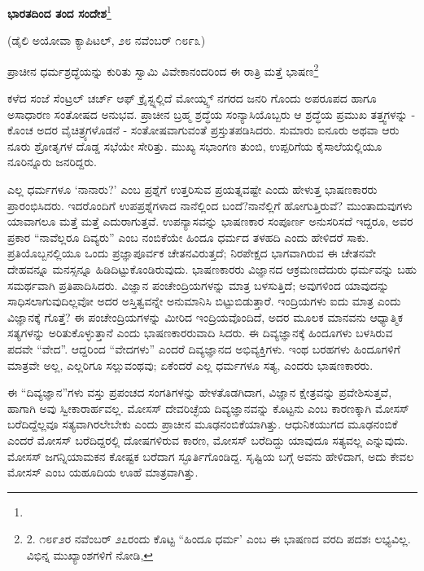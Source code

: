 \begin{center}
\textbf{ಭಾರತದಿಂದ ತಂದ ಸಂದೇಶ}\footnote{}
\end{center}

\begin{center}
(ಡೈಲಿ ಅಯೋವಾ ಕ್ಯಾಪಿಟಲ್, ೨೮ ನವೆಂಬರ್ ೧೮೯೩)
\end{center}

ಪ್ರಾಚೀನ ಧರ್ಮಶ್ರದ್ಧೆಯನ್ನು ಕುರಿತು ಸ್ವಾಮಿ ವಿವೇಕಾನಂದರಿಂದ ಈ ರಾತ್ರಿ ಮತ್ತೆ ಭಾಷಣ\footnote{2. ೧೮೯೨ರ ನವೆಂಬರ್ ೨೭ರಂದು ಕೊಟ್ಟ “ಹಿಂದೂ ಧರ್ಮ’ ಎಂಬ ಈ ಭಾಷಣದ ವರದಿ ಪದಶಃ ಲಭ್ಯವಿಲ್ಲ. ವಿಭಿನ್ನ ಮುಖ್ಯಾಂಶಗಳಿಗೆ ನೋಡಿ, }

ಕಳೆದ ಸಂಜೆ ಸೆಂಟ್ರಲ್ ಚರ್ಚ್ ಆಫ್ ಕ್ರೈಸ್ಟ್ನಲ್ಲಿದೆ ಮೋಯ್ನ್ಸ್ ನಗರದ ಜನರಿ ಗೊಂದು ಅಪರೂಪದ ಹಾಗೂ ಅಸಾಧಾರಣ ಸಂತೋಷದ ಅನುಭವ. ಪ್ರಾಚೀನ ಬ್ರಹ್ಮ ಶ್ರದ್ಧೆಯ ಸಂನ್ಯಾಸಿಯೊಬ್ಬರು ಆ ಶ್ರದ್ಧೆಯ ಪ್ರಮುಖ ತತ್ತ್ವಗಳನ್ನು - ಕೊಂಚ ಅದರ ವೈಚಿತ್ರ್ಯಗಳೊಡನೆ - ಸಂತೋಷವಾಗುವಂತೆ ಪ್ರಸ್ತುತಪಡಿಸಿದರು. ಸುಮಾರು ಐನೂರು ಅಥವಾ ಆರು ನೂರು ಶ್ರೋತೃಗಳ ದೊಡ್ಡ ಸಭೆಯೇ ಸೇರಿತ್ತು. ಮುಖ್ಯ ಸಭಾಂಗಣ ತುಂಬಿ, ಉಪ್ಪರಿಗೆಯ ಕೈಸಾಲೆಯಲ್ಲಿಯೂ ನೂರಿನ್ನೂರು ಜನರಿದ್ದರು.

ಎಲ್ಲ ಧರ್ಮಗಳೂ ‘ನಾನಾರು?’ ಎಂಬ ಪ್ರಶ್ನೆಗೆ ಉತ್ತರಿಸುವ ಪ್ರಯತ್ನವಷ್ಟೇ ಎಂದು ಹೇಳುತ್ತ ಭಾಷಣಕಾರರು ಪ್ರಾರಂಭಿಸಿದರು. ಇದರೊಂದಿಗೆ ಉಪಪ್ರಶ್ನೆಗಳಾದ ನಾನೆಲ್ಲಿಂದ ಬಂದೆ?ನಾನೆಲ್ಲಿಗೆ ಹೋಗುತ್ತಿರುವೆ? ಮುಂತಾದುವುಗಳು ಯಾವಾಗಲೂ ಮತ್ತೆ ಮತ್ತೆ ಎದುರಾಗುತ್ತವೆ. ಉಪನ್ಯಾಸವನ್ನು ಭಾಷಣಕಾರ ಸಂಪೂರ್ಣ ಅನುಸರಿಸದೆ ಇದ್ದರೂ, ಅವರ ಪ್ರಕಾರ “ನಾವೆಲ್ಲರೂ ದಿವ್ಯರು” ಎಂಬ ನಂಬಿಕೆಯೇ ಹಿಂದೂ ಧರ್ಮದ ತಳಹದಿ ಎಂದು ಹೇಳಿದರೆ ಸಾಕು. ಪ್ರತಿಯೊಬ್ಬನಲ್ಲಿಯೂ ಒಂದು ಪ್ರಜ್ಞಾಪೂರ್ವಕ ಚೇತನವಿರುತ್ತದೆ; ನಿರಪೇಕ್ಷದ ಭಾಗವಾಗಿರುವ ಈ ಚೇತನವೇ ದೇಹವನ್ನೂ ಮನಸ್ಸನ್ನೂ ಹಿಡಿದಿಟ್ಟುಕೊಂಡಿರುವುದು. ಭಾಷಣಕಾರರು ವಿಜ್ಞಾನದ ಆಕ್ರಮಣದೆದುರು ಧರ್ಮವನ್ನು ಬಹು ಸಮರ್ಥವಾಗಿ ಪ್ರತಿಪಾದಿಸಿದರು. ವಿಜ್ಞಾನ ಪಂಚೇಂದ್ರಿಯಗಳನ್ನು ಮಾತ್ರ ಬಳಸುತ್ತಿದೆ; ಅವುಗಳಿಂದ ಯಾವುದನ್ನು ಸಾಧಿಸಲಾಗುವುದಿಲ್ಲವೋ ಅದರ ಅಸ್ತಿತ್ವವನ್ನೇ ಅನುಮಾನಿಸಿ ಬಿಟ್ಟುಬಿಡುತ್ತಾರೆ. ಇಂದ್ರಿಯಗಳು ಐದು ಮಾತ್ರ ಎಂದು ವಿಜ್ಞಾನಕ್ಕೆ ಗೊತ್ತೆ? ಈ ಪಂಚೇಂದ್ರಿಯಗಳನ್ನು ಮೀರಿದ ಇಂದ್ರಿಯವೊಂದಿದೆ, ಅದರ ಮೂಲಕ ಮಾನವನು ಆಧ್ಯಾತ್ಮಿಕ ಸತ್ಯಗಳನ್ನು ಅರಿತುಕೊಳ್ಳುತ್ತಾನೆ ಎಂದು ಭಾಷಣಕಾರರುವಾದಿ ಸಿದರು. ಈ ದಿವ್ಯಜ್ಞಾನಕ್ಕೆ ಹಿಂದೂಗಳು ಬಳಸಿರುವ ಪದವೇ “ವೇದ”. ಆದ್ದರಿಂದ “ವೇದಗಳು” ಎಂದರೆ ದಿವ್ಯಜ್ಞಾನದ ಅಭಿವ್ಯಕ್ತಿಗಳು. ಇಂಥ ಬರಹಗಳು ಹಿಂದೂಗಳಿಗೆ ಮಾತ್ರವೇ ಅಲ್ಲ, ಎಲ್ಲರಿಗೂ ಸಲ್ಲುವಂಥವು; ಏಕೆಂದರೆ ಎಲ್ಲ ಧರ್ಮಗಳೂ ಸತ್ಯ, ಎಂದರು ಭಾಷಣಕಾರರು.

ಈ “ದಿವ್ಯಜ್ಞಾನ”ಗಳು ವಸ್ತು ಪ್ರಪಂಚದ ಸಂಗತಿಗಳನ್ನು ಹೇಳತೊಡಗಿದಾಗ, ವಿಜ್ಞಾನ ಕ್ಷೇತ್ರವನ್ನು ಪ್ರವೇಶಿಸುತ್ತವೆ, ಹಾಗಾಗಿ ಅವು ಸ್ವೀಕಾರಾರ್ಹವಲ್ಲ. ಮೋಸಸ್ ದೇವರಿಚ್ಛೆಯ ದಿವ್ಯಜ್ಞಾನವನ್ನು ಕೊಟ್ಟನು ಎಂಬ ಕಾರಣಕ್ಕಾಗಿ ಮೋಸಸ್ ಬರೆದಿದ್ದೆಲ್ಲವೂ ಸತ್ಯವಾಗಿರಲೇಬೇಕು ಎಂದು ಪ್ರಾಚೀನ ಮೂಢನಂಬಿಕೆಯಾಗಿತ್ತು. ಆಧುನಿಕಯುಗದ ಮೂಢನಂಬಿಕೆ ಎಂದರೆ ಮೋಸಸ್ ಬರೆದಿದ್ದರಲ್ಲಿ ದೋಷಗಳಿರುವ ಕಾರಣ, ಮೋಸಸ್ ಬರೆದಿದ್ದು ಯಾವುದೂ ಸತ್ಯವಲ್ಲ ಎನ್ನುವುದು. ಮೋಸಸ್ ಜಗನ್ನಿಯಾಮಕನ ಕೋಷ್ಟಕ ಬರೆದಾಗ ಸ್ಫೂರ್ತಿಗೊಂಡಿದ್ದ. ಸೃಷ್ಟಿಯ ಬಗ್ಗೆ ಅವನು ಹೇಳಿದಾಗ, ಅದು ಕೇವಲ ಮೋಸಸ್ ಎಂಬ ಯಹೂದಿಯ ಊಹೆ ಮಾತ್ರವಾಗಿತ್ತು.

